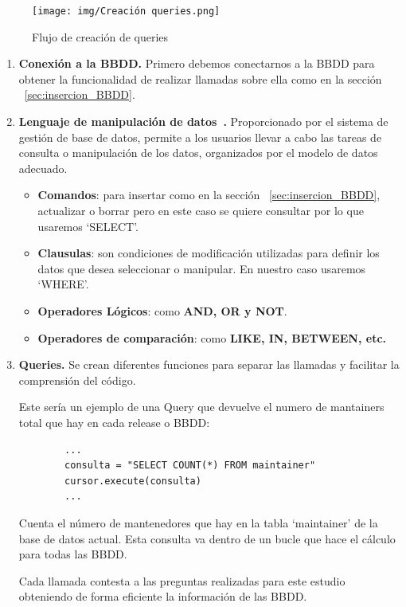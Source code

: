 \documentclass[a4paper, 12pt]{book}
\begin{document}
\begin{figure}
	\centering
	\texttt{[image: img/Creación queries.png]}
	\caption{Flujo de creación de queries}
	\label{fig:flujo creacion queries}
\end{figure}

\begin{enumerate}
	\item \textbf{Conexión a la BBDD.} Primero debemos conectarnos a la BBDD para obtener la funcionalidad de realizar llamadas sobre ella como en la sección ~\ref{sec:insercion_BBDD}.
	
	\item \textbf{Lenguaje de manipulación de datos~\cite{geotalleres:_sql}.} Proporcionado por el sistema de gestión de base de datos, permite a los usuarios llevar a cabo las tareas de consulta o manipulación de los datos, organizados por el modelo de datos adecuado. 

	\begin{itemize}
		\item \textbf{Comandos}: para insertar como en la sección ~\ref{sec:insercion_BBDD}, actualizar o borrar pero en este caso se quiere consultar por lo que usaremos `SELECT'.
		
		\item \textbf{Clausulas}: son condiciones de modificación utilizadas para definir los datos que desea seleccionar o manipular. En nuestro caso usaremos `WHERE'.
		
		\item \textbf{Operadores Lógicos}: como \textbf{AND, OR y NOT}.
		
		\item \textbf{Operadores de comparación}: como \textbf{LIKE, IN, BETWEEN, etc.}
		
	\end{itemize}
	
	\item \textbf{Queries.} Se crean diferentes funciones para separar las llamadas y facilitar la comprensión del código. 
	
	
	
	Este sería un ejemplo de una Query que devuelve el numero de mantainers total que hay en cada release o BBDD:
	
	\begin{verbatim}
		...
		consulta = "SELECT COUNT(*) FROM maintainer"
		cursor.execute(consulta)
		...
	\end{verbatim} 
	
	Cuenta el número de mantenedores que hay en la tabla `maintainer' de la base de datos actual. Esta consulta va dentro de un bucle que hace el cálculo para todas las BBDD.
	
	Cada llamada contesta a las preguntas realizadas para este estudio obteniendo de forma eficiente la información de las BBDD.
	 
\end{enumerate}
\end{document}
